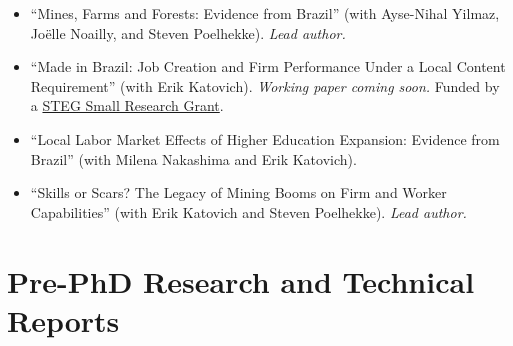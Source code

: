 \documentclass[11pt]{article}
\newenvironment{pubs}
  {\begin{itemize}[leftmargin=1.5em,labelsep=0em,label={},itemsep=6pt,parsep=0pt,topsep=2pt]
   \setlength{\itemindent}{-1.5em}}
  {\end{itemize}}
\begin{document}
\begin{pubs}
  \item ``Mines, Farms and Forests: Evidence from Brazil''
        (with Ayse-Nihal Yilmaz, Joëlle Noailly, and Steven Poelhekke). \textit{Lead author.}
  \item ``Made in Brazil: Job Creation and Firm Performance Under a Local Content Requirement''
        (with Erik Katovich). \textit{Working paper coming soon.} Funded by a
        \href{https://steg.cepr.org/projects/can-natural-resources-promote-industrialisation-firms-competition-and-spillovers}{STEG Small Research Grant}.
  \item ``Local Labor Market Effects of Higher Education Expansion: Evidence from Brazil''
        (with Milena Nakashima and Erik Katovich).
  \item ``Skills or Scars? The Legacy of Mining Booms on Firm and Worker Capabilities''
        (with Erik Katovich and Steven Poelhekke). \textit{Lead author.}
\end{pubs}

\section*{Pre-PhD Research and Technical Reports}
\end{document}
